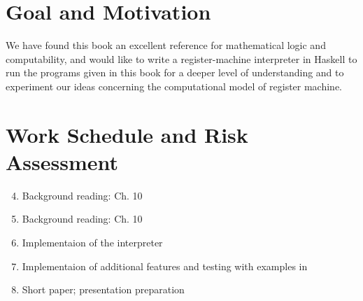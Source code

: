 \documentclass[english]{article}
\begin{document}
\section{Goal and Motivation}
We have found this book an excellent reference for mathematical logic and computability, 
and would like to write a register-machine interpreter in Haskell 
to run the programs given in this book for a deeper level of understanding 
and to experiment our ideas concerning the computational model of register machine.
%
%
\section{Work Schedule and Risk Assessment}
\begin{enumerate}[Week 1.]
\setcounter{enumi}{3}
\item Background reading: \cite{ebbinghaus2013mathematical} Ch. 10
\item Background reading: \cite{ebbinghaus2013mathematical} Ch. 10
\item Implementaion of the interpreter
\item Implementaion of additional features and testing with examples in \cite{ebbinghaus2013mathematical}
\item Short paper; presentation preparation
\end{enumerate}


%

\end{document}
